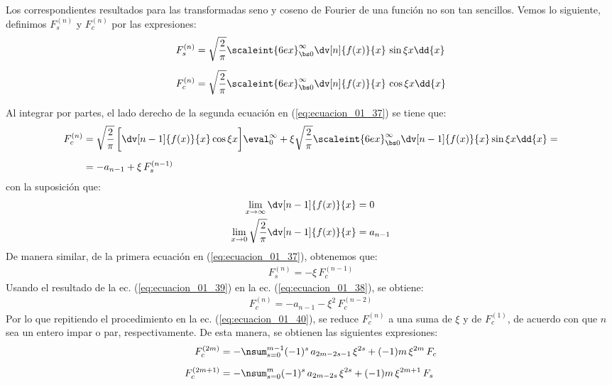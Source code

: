 \par
Los correspondientes resultados para las transformadas seno y coseno de Fourier de una función no son tan sencillos. Vemos lo siguiente, definimos $F_{s}^{(n)}$ y $F_{c}^{(n)}$ por las expresiones:
\begin{align}
\begin{aligned}
F_{s}^{(n)} &= \sqrt{\dfrac{2}{\pi}} \scaleint{6ex}_{\bs 0}^{\infty} \dv[n]{f (x)}{x} \, \sin \xi x \dd{x} \\[0.5em]
F_{c}^{(n)} &= \sqrt{\dfrac{2}{\pi}} \scaleint{6ex}_{\bs 0}^{\infty} \dv[n]{f (x)}{x} \, \cos \xi x \dd{x} \\[0.5em]
\end{aligned}
\label{eq:ecuacion_01_37}
\end{align}
Al integrar por partes, el lado derecho de la segunda ecuación en (\ref{eq:ecuacion_01_37}) se tiene que:
\begin{align}
\begin{aligned}[b]
F_{c}^{(n)} &= \sqrt{\dfrac{2}{\pi}} \, \bigg[ \dv[n-1]{f (x)}{x} \cos \xi x \bigg] \eval_{0}^{\infty} + \xi \sqrt{\dfrac{2}{\pi}} \scaleint{6ex}_{\bs 0}^{\infty} \dv[n-1]{f (x)}{x} \sin \xi x \dd{x} = \\[0.5em]
&= -a_{n-1} + \xi \, F_{s}^{(n-1)}
\end{aligned}
\label{eq:ecuacion_01_38}
\end{align}
con la suposición que:
\begin{align*}
\lim_{x \to \infty} \dv[n-1]{f (x)}{x} &= 0 \\
\lim_{x \to 0}  \sqrt{\dfrac{2}{\pi}} \dv[n-1]{f (x)}{x} &= a_{n-1}
\end{align*}
De manera similar, de la primera ecuación en (\ref{eq:ecuacion_01_37}), obtenemos que:
\begin{align}
F_{s}^{(n)} = - \xi \, F_{c}^{(n-1)}
\label{eq:ecuacion_01_39}
\end{align}
Usando el resultado de la ec. (\ref{eq:ecuacion_01_39}) en la ec. (\ref{eq:ecuacion_01_38}), se obtiene:
\begin{align}
F_{c}^{(n)} = - a_{n-1} - \xi^{2} \, F_{c}^{(n-2)}
\label{eq:ecuacion_01_40}
\end{align}
Por lo que repitiendo el procedimiento en la ec. (\ref{eq:ecuacion_01_40}), se reduce $F_{c}^{(n)}$ a una suma de $\xi$ y de $F_{c}^{(1)}$, de acuerdo con que $n$ sea un entero impar o par, respectivamente. De esta manera, se obtienen las siguientes expresiones:
\begin{align}
F_{c}^{(2m)} &= - \nsum_{s=0}^{m-1} (-1)^{s} \, a_{2m-2s-1} \, \xi^{2s} + (-1){m} \, \xi^{2m} \, F_{c} \label{eq:ecuacion_01_41} \\[0.5em]
F_{c}^{(2m+1)} &= - \nsum_{s=0}^{m} (-1)^{s} \, a_{2m-2s} \, \xi^{2s} + (-1){m} \, \xi^{2m+1} \, F_{s} \label{eq:ecuacion_01_42}
\end{align}


